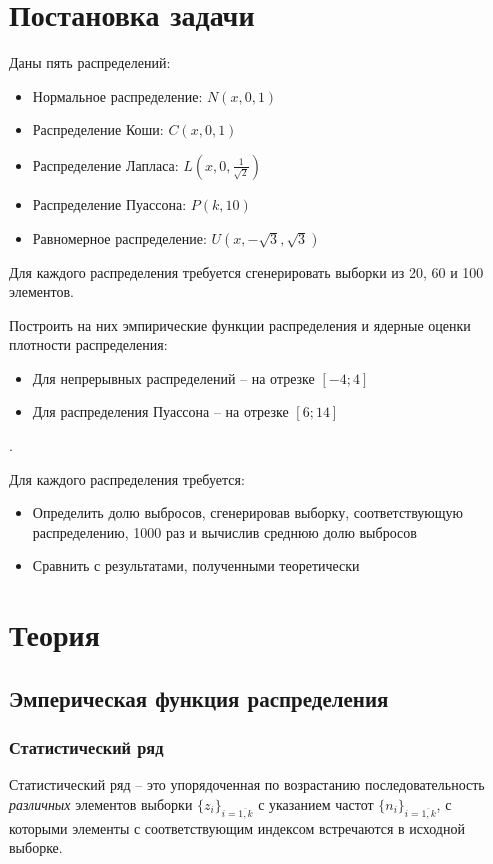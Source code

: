 \section{Постановка задачи}
Даны пять распределений:
\begin{itemize}
\item Нормальное распределение: $N(x, 0, 1)$
\item Распределение Коши: $C(x, 0, 1)$
\item Распределение Лапласа: $L(x, 0, \frac{1}{\sqrt{2}})$
\item Распределение Пуассона: $P(k, 10)$
\item Равномерное распределение: $U(x, -\sqrt{3}, \sqrt{3})$
\end{itemize}

Для каждого распределения требуется сгенерировать выборки из 20, 60 и 100 элементов.

Построить на них эмпирические функции распределения и ядерные оценки плотности распределения:
\begin{itemize}
	\item Для непрерывных распределений -- на отрезке $[-4; 4]$
	\item Для распределения Пуассона -- на отрезке $[6; 14]$
\end{itemize} .

Для каждого распределения требуется:
\begin{itemize}
	\item Определить долю выбросов, сгенерировав выборку, соответствующую распределению, 1000 раз и вычислив среднюю долю выбросов
	\item Сравнить с результатами, полученными теоретически
\end{itemize}

\section{Теория}

\subsection{Эмперическая функция распределения}
\subsubsection{Статистический ряд}	Статистический ряд -- это упорядоченная по возрастанию последовательность \textit{различных} элементов выборки $\{z_i\}_{i = \overline{1,k}}$ с  указанием частот $\{n_i\}_{i = \overline{1,k}}$, с которыми элементы с соответствующим индексом встречаются в исходной выборке.

